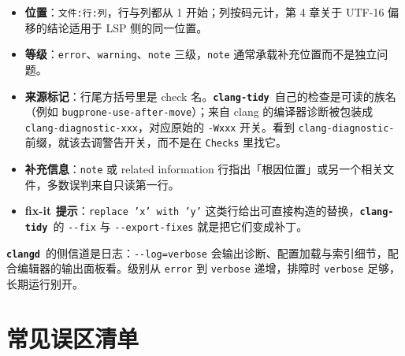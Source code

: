 \documentclass[12pt,a4paper,fontset=fandol]{ctexbook}
\newcommand{\Opt}[1]{\texttt{-\/-#1}}
\newcommand{\Bk}{\discretionary{}{}{}}
\newcommand{\Lib}[1]{\textbf{\texttt{#1}}}
\newcommand{\Tidy}{\Lib{clang-tidy}}
\newcommand{\CD}{\Lib{clangd}}
\begin{document}
\begin{itemize}
  \item \textbf{位置}：\texttt{文件:行:列}，行与列都从 1 开始；列按码元计，第 4 章关于 UTF-16 偏移的结论适用于 LSP 侧的同一位置。
  \item \textbf{等级}：\texttt{error}、\texttt{warning}、\texttt{note} 三级，\texttt{note} 通常承载补充位置而不是独立问题。
  \item \textbf{来源标记}：行尾方括号里是 check 名。\Tidy\ 自己的检查是可读的族名（例如 \texttt{bugprone-\allowbreak use-{\Bk}after-{\Bk}move}）；来自 clang 的编译器诊断被包装成 \texttt{clang-{\Bk}diagnostic-{\Bk}xxx}，对应原始的 \texttt{-Wxxx} 开关。看到 \texttt{clang-{\Bk}diagnostic-} 前缀，就该去调警告开关，而不是在 \texttt{Checks} 里找它。
  \item \textbf{补充信息}：\texttt{note} 或 related information 行指出「根因位置」或另一个相关文件，多数误判来自只读第一行。
  \item \textbf{fix-it 提示}：\texttt{replace 'x' with 'y'} 这类行给出可直接构造的替换，\Tidy\ 的 \Opt{fix} 与 \Opt{export-fixes} 就是把它们变成补丁。
\end{itemize}

\CD\ 的侧信道是日志：\Opt{log=verbose} 会输出诊断、配置加载与索引细节，配合编辑器的输出面板看。级别从 \texttt{error} 到 \texttt{verbose} 递增，排障时 \texttt{verbose} 足够，长期运行别开。

\section{常见误区清单}\label{sec:ch17-s13}
\end{document}
